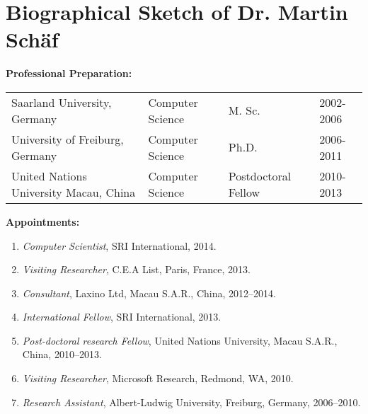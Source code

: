 \documentclass{article}
\begin{document}
\newpage

\setcounter{section}{4}
\renewcommand{\thesection}{\Alph{section}}
\section*{Biographical Sketch of Dr. Martin Sch\"af}


\bigskip
\noindent
{\bf Professional Preparation:} 

\medskip
\begin{tabular}{l l l l }
Saarland University, Germany
&
Computer Science
&
M. Sc. & 2002-2006
\\
University of Freiburg, Germany
&
Computer Science
&
Ph.D. & 2006-2011
\\
United Nations University Macau, China
&
Computer Science
&
Postdoctoral Fellow & 2010-2013

\end{tabular}


\bigskip
\noindent
{\bf Appointments:} 
\begin{enumerate}
\itemsep=0in

\item
{\it Computer Scientist\/}, SRI International, 2014.

\item
{\it Visiting Researcher\/}, C.E.A List, Paris, France, 2013.

\item
{\it Consultant\/}, Laxino Ltd, Macau S.A.R., China, 2012--2014.

\item
{\it International Fellow\/}, SRI International, 2013.

\item
{\it Post-doctoral research Fellow\/}, United Nations University, Macau S.A.R., China, 2010--2013.

\item
{\it Visiting Researcher\/}, Microsoft Research, Redmond, WA, 2010.

\item
{\it Research Assistant}, Albert-Ludwig University, Freiburg, Germany, 2006--2010.

\end{enumerate}
\end{document}
